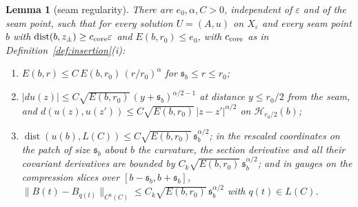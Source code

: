 \documentclass[11pt]{amsart}
\newtheorem{lemma}[theorem]{Lemma}
\theoremstyle{definition}
\theoremstyle{remark}
\theoremstyle{plain}
\numberwithin{equation}{section}
\newcommand{\eps}{\varepsilon}
\newcommand{\dist}{\operatorname{dist}}
\begin{document}
\begin{lemma}[seam regularity]\label{lem:seam-regularity}
There are $e_0,\alpha,C>0$, independent of $\eps$ and of the seam point, such that
for every solution $U=(A,u)$ on $X_\eps$ and every seam point $b$ with
$\dist(b,z_\pm)\ge c_{\rm core}\eps$ and $E(b,r_0)\le e_0$, with $c_{\rm core}$ as in
Definition~\ref{def:insertion}(i):
\begin{enumerate}[label=(\roman*)]
\item $E(b,r)\le C\,E(b,r_0)\,(r/r_0)^\alpha$ for ${\mathfrak s}_b\le r\le r_0$;
\item $|du(z)|\le C\sqrt{E(b,r_0)}\,(y+{\mathfrak s}_b)^{\alpha/2-1}$ at distance
  $y\le r_0/2$ from the seam, and
  $d(u(z),u(z'))\le C\sqrt{E(b,r_0)}\,|z-z'|^{\alpha/2}$ on $\mathcal H_{r_0/2}(b)$;
\item $\dist(u(b),L(C))\le C\sqrt{E(b,r_0)}\,{\mathfrak s}_b^{\alpha/2}$; in the
  rescaled coordinates on the patch of size ${\mathfrak s}_b$ about $b$ the
  curvature, the section derivative and all their covariant derivatives are
  bounded by $C_k\sqrt{E(b,r_0)}\,{\mathfrak s}_b^{\alpha/2}$; and in gauges on the
  compression slices over $[b-{\mathfrak s}_b,b+{\mathfrak s}_b]$,
  $\|B(t)-B_{q(t)}\|_{C^k(C)}\le C_k\sqrt{E(b,r_0)}\,{\mathfrak s}_b^{\alpha/2}$ with
  $q(t)\in L(C)$.
\end{enumerate}
\end{lemma}
\end{document}
